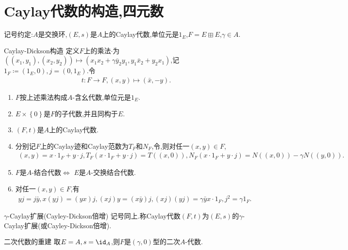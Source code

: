 \section{Caylay代数的构造,四元数}

记号约定:$A$是交换环,$\left(E,s\right)$是$A$上的Caylay代数,单位元是$1_{E}$,$F=E\boxplus E$,$\gamma\in A$.

\begin{proposition}{Caylay-Dickson构造}{}
	定义$F$上的乘法$\cdot$为$\left(\left(x_{1},y_{1}\right),\left(x_{2},y_{2}\right)\right)\mapsto\left(x_{1}x_{2}+\gamma \bar{y}_{2}y_{1},y_{1}\bar{x}_{2}+y_{2}x_{1}\right)$,记$1_{F}\coloneq\left(1_{E},0\right),j=\left(0,1_{E}\right)$.令
	\begin{align*}
		t:F\to F,\left(x,y\right)\mapsto\left(\bar{x},-y\right).
	\end{align*}
	\begin{enumerate}
		\item $F$按上述乘法构成$A$-含幺代数,单位元是$1_{E}$.
		\item $E\times\left\{0\right\}$是$F$的子代数,并且同构于$E$.
		\item $\left(F,t\right)$是$A$上的Caylay代数.
		\item 分别记$F$上的Caylay迹和Caylay范数为$T_{F}$和$N_{F}$,令,则对任一$\left(x,y\right)\in F$,
		\begin{align*}
			\left(x,y\right)=x\cdot 1_{F}+y\cdot j,T_{F}\left(x\cdot 1_{F}+y\cdot j\right)=T\left(\left(x,0\right)\right),N_{F}\left(x\cdot 1_{F}+y\cdot j\right)=N\left(\left(x,0\right)\right)-\gamma N\left(\left(y,0\right)\right).
		\end{align*}
		\item $F$是$A$-结合代数$\iff$ $E$是$A$-交换结合代数.
		\item 对任一$\left(x,y\right)\in F$,有
		\begin{align*}
			yj=j\bar{y},x\left(yj\right)=\left(yx\right)j,\left(xj\right)y=\left(x\bar{y}\right)j,\left(xj\right)\left(yj\right)=\gamma\bar{y}x\cdot 1_{F},j^{2}=\gamma 1_{F}.
		\end{align*}
	\end{enumerate}
\end{proposition}

\begin{definition}{$\gamma$-Caylay扩展(Cayley-Dickson倍增)}{}
	记号同上.称Caylay代数$\left(F,t\right)$为$\left(E,s\right)$的$\gamma$-Caylay扩展(或Cayley-Dickson倍增).
\end{definition}

\begin{example}{二次代数的重建}{}
	取$E=A,s=\id_{A}$,则$F$是$\left(\gamma,0\right)$型的二次$A$-代数.
\end{example}

